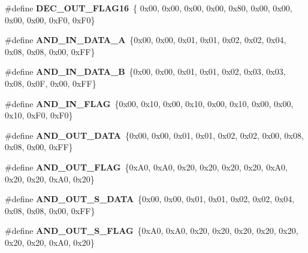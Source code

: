 \begin{DoxyCompactItemize}
\#define {\bfseries D\+E\+C\+\_\+\+O\+U\+T\+\_\+\+F\+L\+A\+G16}~\{  0x00,   0x00,   0x00,   0x00,   0x80,   0x00,   0x00,   0x00,   0x00,   0x\+F0,   0x\+F0\}
\item 
\mbox{\label{unit-test-cpu-dispatch_8c_adaf9c49f99e1ed08592629d00ff1ca0d}} 
\#define {\bfseries A\+N\+D\+\_\+\+I\+N\+\_\+\+D\+A\+T\+A\+\_\+A}~\{0x00, 0x00, 0x01, 0x01, 0x02, 0x02, 0x04, 0x08, 0x08, 0x00, 0x\+F\+F\}
\item 
\mbox{\label{unit-test-cpu-dispatch_8c_af49770246c2634bf353d3d2511a1eb40}} 
\#define {\bfseries A\+N\+D\+\_\+\+I\+N\+\_\+\+D\+A\+T\+A\+\_\+B}~\{0x00, 0x00, 0x01, 0x01, 0x02, 0x03, 0x03, 0x08, 0x0\+F, 0x00, 0x\+F\+F\}
\item 
\mbox{\label{unit-test-cpu-dispatch_8c_a81d2e7a323679f487fef407559c0c44b}} 
\#define {\bfseries A\+N\+D\+\_\+\+I\+N\+\_\+\+F\+L\+AG}~\{0x00, 0x10, 0x00, 0x10, 0x00, 0x10, 0x00, 0x00, 0x10, 0x\+F0, 0x\+F0\}
\item 
\mbox{\label{unit-test-cpu-dispatch_8c_a00b92d39fb3d1e3837c7b33c897dad65}} 
\#define {\bfseries A\+N\+D\+\_\+\+O\+U\+T\+\_\+\+D\+A\+TA}~\{0x00, 0x00, 0x01, 0x01, 0x02, 0x02, 0x00, 0x08, 0x08, 0x00, 0x\+F\+F\}
\item 
\mbox{\label{unit-test-cpu-dispatch_8c_a6b6259d71981920f07a962bb08270caa}} 
\#define {\bfseries A\+N\+D\+\_\+\+O\+U\+T\+\_\+\+F\+L\+AG}~\{0x\+A0, 0x\+A0, 0x20, 0x20, 0x20, 0x20, 0x\+A0, 0x20, 0x20, 0x\+A0, 0x20\}
\item 
\mbox{\label{unit-test-cpu-dispatch_8c_ac484f884c76cec8b1ac9b2f85fcd1946}} 
\#define {\bfseries A\+N\+D\+\_\+\+O\+U\+T\+\_\+\+S\+\_\+\+D\+A\+TA}~\{0x00, 0x00, 0x01, 0x01, 0x02, 0x02, 0x04, 0x08, 0x08, 0x00, 0x\+F\+F\}
\item 
\mbox{\label{unit-test-cpu-dispatch_8c_a4ce5e43158d077c400a459fe8c29e956}} 
\#define {\bfseries A\+N\+D\+\_\+\+O\+U\+T\+\_\+\+S\+\_\+\+F\+L\+AG}~\{0x\+A0, 0x\+A0, 0x20, 0x20, 0x20, 0x20, 0x20, 0x20, 0x20, 0x\+A0, 0x20\}
\item 
\mbox{\label{unit-test-cpu-dispatch_8c_ad16d557e9d511f29ab5ec1c8485ac3bc}} 

\end{DoxyCompactItemize}
